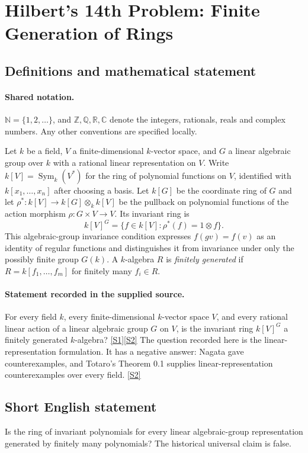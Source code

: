 \documentclass[11pt]{article}
\newcommand{\sref}[2]{\hyperlink{source:#1:#2}{[S#2]}}
\begin{document}
\section{Hilbert's 14th Problem: Finite Generation of Rings}\label{statement}

\subsection{Definitions and mathematical statement}

\paragraph{Shared notation.}$\mathbb N=\{1,2,\ldots\}$, and $\mathbb Z,\mathbb Q,\mathbb R,\mathbb C$ denote the integers, rationals, reals and complex numbers. Any other conventions are specified locally.


Let $k$ be a field, $V$ a finite-dimensional $k$-vector space, and $G$ a linear algebraic group over $k$ with a rational linear representation on $V$. Write $k[V]=\operatorname{Sym}_k(V^*)$ for the ring of polynomial functions on $V$, identified with $k[x_1,\ldots,x_n]$ after choosing a basis. Let $k[G]$ be the coordinate ring of $G$ and let $\rho^*:k[V]\to k[G]\otimes_k k[V]$ be the pullback on polynomial functions of the action morphism $\rho:G\times V\to V$. Its invariant ring is
\[
k[V]^G=\{f\in k[V]:\rho^*(f)=1\otimes f\}.
\]
This algebraic-group invariance condition expresses $f(gv)=f(v)$ as an identity of regular functions and distinguishes it from invariance under only the possibly finite group $G(k)$. A $k$-algebra $R$ is \emph{finitely generated} if $R=k[f_1,\ldots,f_m]$ for finitely many $f_i\in R$.
\paragraph{Statement recorded in the supplied source.}
For every field $k$, every finite-dimensional $k$-vector space $V$, and every rational linear action of a linear algebraic group $G$ on $V$, is the invariant ring $k[V]^G$ a finitely generated $k$-algebra? \sref{statement}{1}\sref{statement}{2}
The question recorded here is the linear-representation formulation. It has a negative answer: Nagata gave counterexamples, and Totaro's Theorem 0.1 supplies linear-representation counterexamples over every field. \sref{statement}{2}
\subsection{Short English statement}
Is the ring of invariant polynomials for every linear algebraic-group representation generated by finitely many polynomials? The historical universal claim is false.
\end{document}
